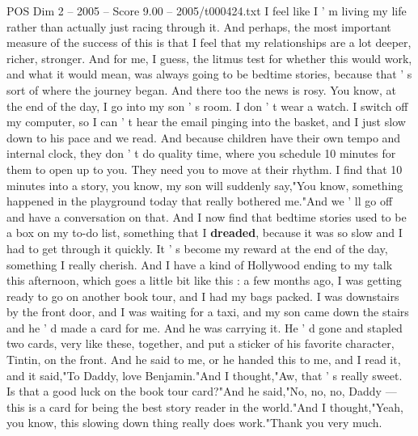 \begin{textsample}{POS Dim 2 – 2005 – Score 9.00 – 2005/t000424.txt}
I feel like I ' m living my life rather than actually just racing through it.
And perhaps, the most important measure of the success of this is that I feel that my relationships are a lot deeper, richer, stronger.
And for me, I guess, the litmus test for whether this would work, and what it would mean, was always going to be bedtime stories, because that ' s sort of where the journey began.
And there too the news is rosy.
You know, at the end of the day, I go into my son ' s room.
I don ' t wear a watch.
I switch off my computer, so I can ' t hear the email pinging into the basket, and I just slow down to his pace and we read.
And because children have their own tempo and internal clock, they don ' t do quality time, where you schedule 10 minutes for them to open up to you.
They need you to move at their rhythm.
I find that 10 minutes into a story, you know, my son will suddenly say,"You know, something happened in the playground today that really bothered me."And we ' ll go off and have a conversation on that.
And I now find that bedtime stories used to be a box on my to-do list, something that I \textbf{dreaded}, because it was so slow and I had to get through it quickly.
It ' s become my reward at the end of the day, something I really cherish.
And I have a kind of Hollywood ending to my talk this afternoon, which goes a little bit like this : a few months ago, I was getting ready to go on another book tour, and I had my bags packed.
I was downstairs by the front door, and I was waiting for a taxi, and my son came down the stairs and he ' d made a card for me.
And he was carrying it.
He ' d gone and stapled two cards, very like these, together, and put a sticker of his favorite character, Tintin, on the front.
And he said to me, or he handed this to me, and I read it, and it said,"To Daddy, love Benjamin."And I thought,"Aw, that ' s really sweet.
Is that a good luck on the book tour card?"And he said,"No, no, no, Daddy — this is a card for being the best story reader in the world."And I thought,"Yeah, you know, this slowing down thing really does work."Thank you very much.

\end{textsample}
